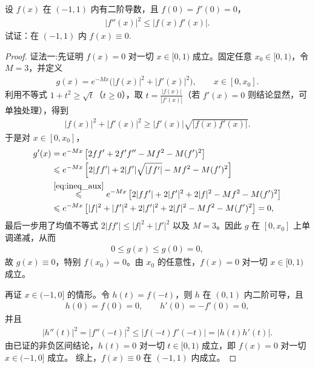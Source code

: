 \documentclass[../../main.tex]{subfiles}%
\begin{document}
\begin{example}
设 $f(x)$ 在 $(-1,1)$ 内有二阶导数，且 $f(0)=f'(0)=0$，
\begin{align*}
|f''(x)|^2 \leqslant |f(x)f'(x)|.
\end{align*}
试证：在 $(-1,1)$ 内 $f(x)\equiv 0$.
\end{example}
\begin{proof}

{\color{blue}证法一:}先证明 $f(x)=0$ 对一切 $x\in[0,1)$ 成立。固定任意 $x_0\in[0,1)$，令 $M=3$，并定义
\begin{align*}
g(x)=e^{-Mx}\bigl(|f(x)|^2+|f'(x)|^2\bigr),\qquad x\in[0,x_0].
\end{align*}
利用不等式 $1+t^2\geqslant\sqrt{t}$（$t\geqslant0$），取 $t=\frac{|f(x)|}{|f'(x)|}$（若 $f'(x)=0$ 则结论显然，可单独处理），得到
\begin{align}
|f(x)|^2+|f'(x)|^2\geqslant |f'(x)|\sqrt{|f(x)f'(x)|}. \label{eq:ineq_aux}
\end{align}
于是对 $x\in[0,x_0]$，
\begin{align*}
g'(x)&=e^{-Mx}\left[2ff'+2f'f''-Mf^2-M(f')^2\right] \\
&\leqslant e^{-Mx}\left[2|ff'|+2|f'|\sqrt{|ff'|}-Mf^2-M(f')^2\right] \\
&\stackrel{\eqref{eq:ineq_aux}}{\leqslant} e^{-Mx}\left[2|ff'|+2|f'|^2+2|f|^2-Mf^2-M(f')^2\right] \\
&\leqslant e^{-Mx}\left[|f|^2+|f'|^2+2|f'|^2+2|f|^2-Mf^2-M(f')^2\right]=0,
\end{align*}
最后一步用了均值不等式 $2|ff'|\leqslant |f|^2+|f'|^2$ 以及 $M=3$。因此 $g$ 在 $[0,x_0]$ 上单调递减，从而
\begin{align*}
0\leqslant g(x)\leqslant g(0)=0,
\end{align*}
故 $g(x)\equiv0$，特别 $f(x_0)=0$。由 $x_0$ 的任意性，$f(x)=0$ 对一切 $x\in[0,1)$ 成立。

再证 $x\in(-1,0]$ 的情形。令 $h(t)=f(-t)$，则 $h$ 在 $(0,1)$ 内二阶可导，且
\begin{align*}
h(0)=f(0)=0,\qquad h'(0)=-f'(0)=0,
\end{align*}
并且
\begin{align*}
|h''(t)|^2=|f''(-t)|^2\leqslant |f(-t)f'(-t)|=|h(t)h'(t)|.
\end{align*}
由已证的非负区间结论，$h(t)=0$ 对一切 $t\in[0,1)$ 成立，即 $f(x)=0$ 对一切 $x\in(-1,0]$ 成立。
综上，$f(x)\equiv0$ 在 $(-1,1)$ 内成立。


\end{proof}
\end{document}
